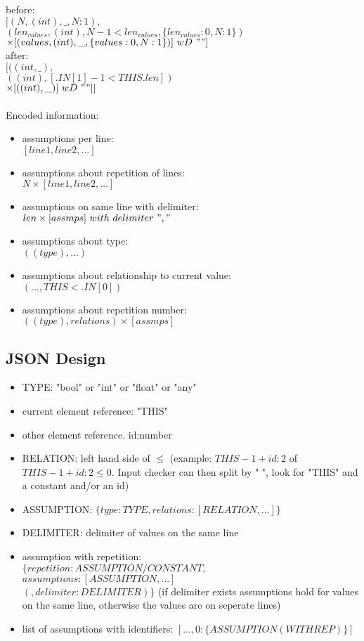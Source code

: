 \documentclass[11pt]{article}
\begin{document}
before:\\
$[(N, (int), \_, {N: 1}),$\\
$(len_{values}, (int), N-1 < len_{values}, \{len_{values}: 0, N: 1\})$\\
$\times [(values, (int), \_, \{values: 0, N: 1\})]\ wD\ " "]$\\
after:\\
$[((int, \_),$\\
$((int), [.IN[1]-1 < THIS.len])$\\
$\times [((int), \_)]\ wD\ " "]]$\\
\\
Encoded information:\\
\begin{itemize}
  \item assumptions per line:\\
  $[line1, line2, ...]$
  \item assumptions about repetition of lines:\\
  $N \times [line1, line2, ...]$
  \item assumptions on same line with delimiter:\\
  $len \times [assmps]\ with\ delimiter\ ","$
  \item assumptions about type:\\
  $((type), ...)$
  \item assumptions about relationship to current value:\\
  $(..., THIS < .IN[0])$
  \item assumptions about repetition number:\\
  $((type), relations) \times [assmps]$
\end{itemize}

\subsection{JSON Design}

\begin{itemize}
  \item TYPE: "bool" or "int" or "float" or "any"
  \item current element reference: "THIS"
  \item other element reference. id:number
  \item RELATION: left hand side of $\leq$ (example: $THIS - 1 + id{:}2$ of $THIS - 1 + id{:}2 \leq 0$. Input checker can then split by " ", look for "THIS" and a constant and/or an id)
  \item ASSUMPTION: $\{type: TYPE, relations: [RELATION, ...]\}$
  \item DELIMITER: delimiter of values on the same line
  \item assumption with repetition:\\
  $\{repetition:ASSUMPTION/CONSTANT,$\\
  $assumptions:[ASSUMPTION, ...]$\\
  $(, delimiter:DELIMITER)\}$ (if delimiter exists assumptions hold for values on the same line, otherwise the values are on seperate lines)
  \item list of assumptions with identifiers: $[..., 0{:}\{ASSUMPTION(WITHREP)\}]$
\end{itemize}
\end{document}

